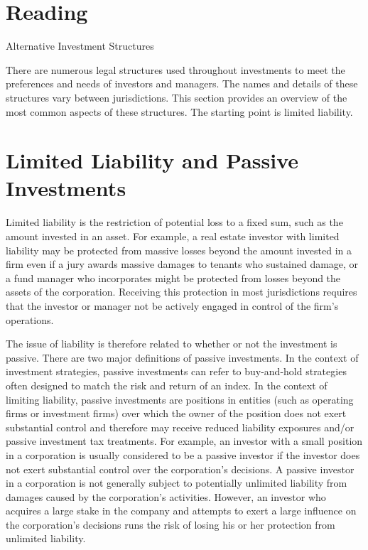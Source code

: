 \documentclass[11pt]{article}
\begin{document}
\section*{Reading}
Alternative Investment Structures

There are numerous legal structures used throughout investments to meet the preferences and needs of investors and managers. The names and details of these structures vary between jurisdictions. This section provides an overview of the most common aspects of these structures. The starting point is limited liability.

\section*{Limited Liability and Passive Investments}
Limited liability is the restriction of potential loss to a fixed sum, such as the amount invested in an asset. For example, a real estate investor with limited liability may be protected from massive losses beyond the amount invested in a firm even if a jury awards massive damages to tenants who sustained damage, or a fund manager who incorporates might be protected from losses beyond the assets of the corporation. Receiving this protection in most jurisdictions requires that the investor or manager not be actively engaged in control of the firm's operations.

The issue of liability is therefore related to whether or not the investment is passive. There are two major definitions of passive investments. In the context of investment strategies, passive investments can refer to buy-and-hold strategies often designed to match the risk and return of an index. In the context of limiting liability, passive investments are positions in entities (such as operating firms or investment firms) over which the owner of the position does not exert substantial control and therefore may receive reduced liability exposures and/or passive investment tax treatments. For example, an investor with a small position in a corporation is usually considered to be a passive investor if the investor does not exert substantial control over the corporation's decisions. A passive investor in a corporation is not generally subject to potentially unlimited liability from damages caused by the corporation's activities. However, an investor who acquires a large stake in the company and attempts to exert a large influence on the corporation's decisions runs the risk of losing his or her protection from unlimited liability.
\end{document}
